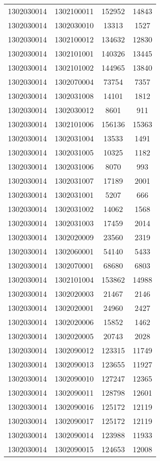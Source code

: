 \begin{longtable}[h]{llcc}
		1302030014 & 1302100011 & 152952 & 14843\\
		1302030014 & 1302030010 & 13313 & 1527\\
		1302030014 & 1302100012 & 134632 & 12830\\
		1302030014 & 1302101001 & 140326 & 13445\\
		1302030014 & 1302101002 & 144965 & 13840\\
		1302030014 & 1302070004 & 73754 & 7357\\
		1302030014 & 1302031008 & 14101 & 1812\\
		1302030014 & 1302030012 & 8601 & 911\\
		1302030014 & 1302101006 & 156136 & 15363\\
		1302030014 & 1302031004 & 13533 & 1491\\
		1302030014 & 1302031005 & 10325 & 1182\\
		1302030014 & 1302031006 & 8070 & 993\\
		1302030014 & 1302031007 & 17189 & 2001\\
		1302030014 & 1302031001 & 5207 & 666\\
		1302030014 & 1302031002 & 14062 & 1568\\
		1302030014 & 1302031003 & 17459 & 2014\\
		1302030014 & 1302020009 & 23560 & 2319\\
		1302030014 & 1302060001 & 54140 & 5433\\
		1302030014 & 1302070001 & 68680 & 6803\\
		1302030014 & 1302101004 & 153862 & 14988\\
		1302030014 & 1302020003 & 21467 & 2146\\
		1302030014 & 1302020001 & 24960 & 2427\\
		1302030014 & 1302020006 & 15852 & 1462\\
		1302030014 & 1302020005 & 20743 & 2028\\
		1302030014 & 1302090012 & 123315 & 11749\\
		1302030014 & 1302090013 & 123655 & 11927\\
		1302030014 & 1302090010 & 127247 & 12365\\
		1302030014 & 1302090011 & 128798 & 12601\\
		1302030014 & 1302090016 & 125172 & 12119\\
		1302030014 & 1302090017 & 125172 & 12119\\
		1302030014 & 1302090014 & 123988 & 11933\\
		1302030014 & 1302090015 & 124653 & 12008\\

\end{longtable}
